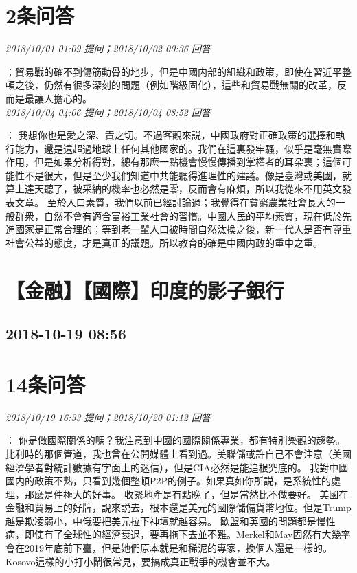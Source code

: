 \documentclass[twocolumn]{ctexart}
\begin{document}
\section{2条问答}

\textit{\hfill\noindent\small 2018/10/01 01:09 提问；2018/10/02 00:36 回答}

：貿易戰的確不到傷筋動骨的地步，但是中國内部的組織和政策，即使在習近平整頓之後，仍然有很多深刻的問題（例如階級固化），這些和貿易戰無關的改革，反而是最讓人擔心的。
\\

\textit{\hfill\noindent\small 2018/10/04 04:06 提问；2018/10/04 08:52 回答}

：
我想你也是愛之深、責之切。不過客觀來説，中國政府對正確政策的選擇和執行能力，還是遠超過地球上任何其他國家的。我們在這裏發牢騷，似乎是毫無實際作用，但是如果分析得對，總有那麽一點機會慢慢傳播到掌權者的耳朵裏；這個可能性不是很大，但是至少我們知道中共能聽得進理性的建議。像是臺灣或美國，就算上達天聽了，被采納的機率也必然是零，反而會有麻煩，所以我從來不用英文發表文章。
至於人口素質，我們以前已經討論過；我覺得在貧窮農業社會長大的一般群衆，自然不會有適合富裕工業社會的習慣。中國人民的平均素質，現在低於先進國家是正常合理的；等到老一輩人口被時間自然汰換之後，新一代人是否有尊重社會公益的態度，才是真正的議題。所以教育的確是中國内政的重中之重。
\\


\section{【金融】【國際】印度的影子銀行}
\subsection{2018-10-19 08:56}


\section{14条问答}

\textit{\hfill\noindent\small 2018/10/19 16:33 提问；2018/10/20 01:12 回答}

：
你是做國際關係的嗎？我注意到中國的國際關係專業，都有特別樂觀的趨勢。
比利時的那個管道，我也曾在公開媒體上看到過。美聯儲或許自己不會注意（美國經濟學者對統計數據有字面上的迷信），但是CIA必然是能追根究底的。
我對中國國内的政策不熟，只看到幾個整頓P2P的例子。如果真如你所説，是系統性的處理，那麽是件極大的好事。
收緊地產是有點晚了，但是當然比不做要好。
美國在金融和貿易上的好牌，說來説去，根本還是美元的國際儲備貨幣地位。但是Trump越是欺凌弱小，中俄要把美元拉下神壇就越容易。
歐盟和英國的問題都是慢性病，即使有了全球性的經濟衰退，要再拖下去並不難。Merkel和May固然有大幾率會在2019年底前下臺，但是她們原本就是和稀泥的專家，換個人還是一樣的。Kosovo這樣的小打小鬧很常見，要搞成真正戰爭的機會並不大。
\\
\end{document}
